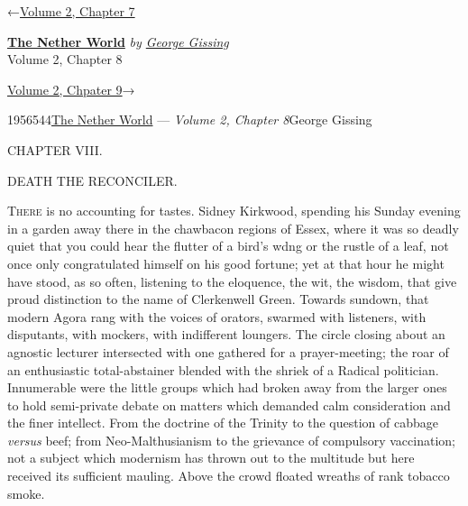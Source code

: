 \hypertarget{headerContainer}{}
\hypertarget{navigationHeader}{}
\protect\hypertarget{headerprevious}{}{←\href{/wiki/The_Nether_World/Volume_2/Chapter_7}{Volume
2, Chapter 7}}

\textbf{\protect\hypertarget{header_title_text}{}{\href{/wiki/The_Nether_World}{The
Nether World}}} \emph{by
\href{/wiki/Author:George_Gissing}{\protect\hypertarget{header_author_text}{}{{George
Gissing}}}}\\
\protect\hypertarget{header_section_text}{}{Volume 2, Chapter 8}

\protect\hypertarget{headernext}{}{\href{/wiki/The_Nether_World/Volume_2/Chapter_9}{Volume
2, Chpater 9}→}

\hypertarget{navigationNotes}{}

\hypertarget{ws-data}{}
\protect\hypertarget{ws-article-id}{}{1956544}\protect\hypertarget{ws-title}{}{\href{/wiki/The_Nether_World}{The
Nether World} --- \emph{Volume 2, Chapter
8}}\protect\hypertarget{ws-author}{}{George Gissing}

{\protect\hypertarget{149}{}{}}

{CHAPTER VIII.}

DEATH THE RECONCILER.

\textsc{There} is no accounting for tastes. Sidney Kirkwood, spending
his Sunday evening in a garden away there in the chawbacon regions of
Essex, where it was so deadly quiet that you could hear the flutter of a
bird's wdng or the rustle of a leaf, not once only congratulated himself
on his good fortune; yet at that hour he might have stood, as so often,
listening to the eloquence, the wit, the wisdom, that give proud
distinction to the name of Clerkenwell Green. Towards sundown, that
modern Agora rang with the voices of orators, swarmed with listeners,
with disputants, with mockers, with indifferent loungers. The circle
closing about an agnostic lecturer intersected with one gathered for a
prayer-meeting; the roar of an enthusiastic
{\protect\hypertarget{150}{}{}}total-abstainer blended with the shriek
of a Radical politician. Innumerable were the little groups which had
broken away from the larger ones to hold semi-private debate on matters
which demanded calm consideration and the finer intellect. From the
doctrine of the Trinity to the question of cabbage \emph{versus} beef;
from Neo-Malthusianism to the grievance of compulsory vaccination; not a
subject which modernism has thrown out to the multitude but here
received its sufficient mauling. Above the crowd floated wreaths of rank
tobacco smoke.

